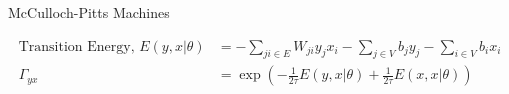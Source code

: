 \documentclass[10pt,appendixnumberbeamer]{beamer}
\begin{document}
\begin{frame}{McCulloch-Pitts Machines}
\begin{figure}[h]
\end{figure}
\begin{align*}
\text{Transition Energy, }E(y,x|\theta) &= -\sum_{ji \in E}W_{ji}y_jx_i- \sum_{j \in V}b_j y_j- \sum_{i \in V}b_i x_i\\
\Gamma_{yx} &=\exp\left(-\frac{1}{2\tau}E(y,x|\theta)+\frac{1}{2\tau}E(x,x|\theta)\right)\\
\end{align*}
\note{
\scriptsize
}
\end{frame}
\end{document}

